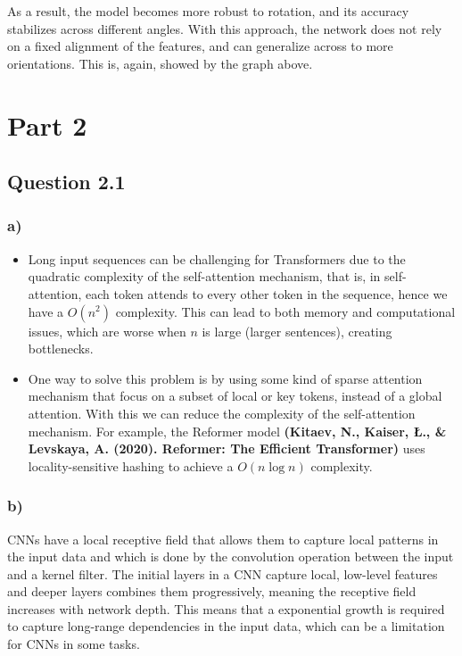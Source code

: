 \documentclass{article}
\begin{document}
As a result, the model becomes more robust to rotation, and its accuracy stabilizes across different angles.
With this approach, the network does not rely on a fixed alignment of the features, and can generalize across
to more orientations. This is, again, showed by the graph above.

\newpage

\section*{Part 2}

\subsection*{Question 2.1}

\subsubsection*{a)}

\begin{itemize}
    \item Long input sequences can be challenging for Transformers due to the quadratic complexity of the self-attention mechanism, 
    that is, in self-attention, each token attends to every other token in the sequence, hence we have a  
    $O(n^2)$ complexity. This can lead to both memory
    and computational issues, which are worse when $n$ is large (larger sentences), creating bottlenecks.

    \item One way to solve this problem is by using some kind of sparse attention mechanism that focus on a subset
of local or key tokens, instead of a global attention. With this we can reduce the complexity of the self-attention mechanism. For example,
the Reformer model \textbf{(Kitaev, N., Kaiser, Ł., \& Levskaya, A. (2020). Reformer: The Efficient Transformer)}
uses locality-sensitive hashing to achieve a $O(n \log n)$ complexity.
\end{itemize}

\subsubsection*{b)}

CNNs have a local receptive field that allows them to capture local patterns in the input data and which is done
by the convolution operation between the input and a kernel filter. The initial layers in a CNN capture local, low-level
features and deeper layers combines them progressively, meaning the receptive field increases with network depth. This means
that a exponential growth is required to capture long-range dependencies in the input data, which can be a limitation
for CNNs in some tasks.
\end{document}
